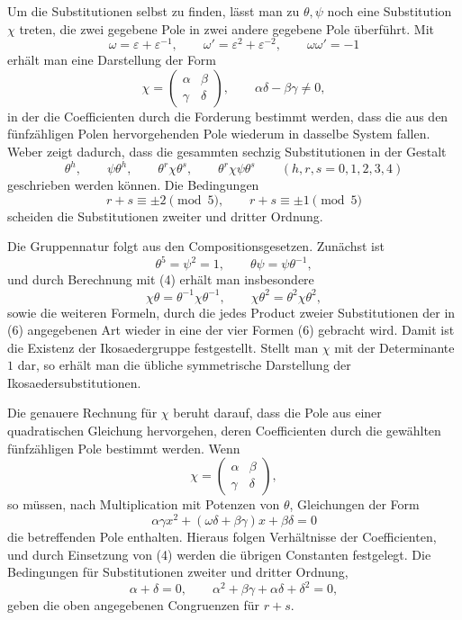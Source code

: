 \documentclass[11pt]{article}
\providecommand{\eps}{\varepsilon}
\providecommand{\eps}{\varepsilon}
\providecommand{\mat}[4]{\begin{pmatrix}#1&#2\\#3&#4\end{pmatrix}}
\providecommand{\mat}[4]{\begin{pmatrix}#1&#2\\#3&#4\end{pmatrix}}
\begin{document}
Um die Substitutionen selbst zu finden, lässt man zu $\theta,\psi$ noch eine Substitution $\chi$ treten, die zwei gegebene Pole in zwei andere gegebene Pole überführt. Mit
\[
 \omega=\eps+\eps^{-1},\qquad \omega'=\eps^2+\eps^{-2},\qquad
 \omega\omega'=-1
\tag{4}
\]
erhält man eine Darstellung der Form
\begin{equation}
 \chi=\mat{\alpha}{\beta}{\gamma}{\delta},
\qquad
 \alpha\delta-\beta\gamma\ne0,
\tag{5}
\end{equation}
in der die Coefficienten durch die Forderung bestimmt werden, dass die aus den fünfzähligen Polen hervorgehenden Pole wiederum in dasselbe System fallen. Weber zeigt dadurch, dass die gesammten sechzig Substitutionen in der Gestalt
\begin{equation}
 \theta^h,\qquad
 \psi\theta^h,\qquad
 \theta^r\chi\theta^s,\qquad
 \theta^r\chi\psi\theta^s\qquad (h,r,s=0,1,2,3,4)
\tag{6}
\end{equation}
geschrieben werden können. Die Bedingungen
\[
 r+s\equiv \pm2\pmod5,\qquad r+s\equiv \pm1\pmod5
\]
scheiden die Substitutionen zweiter und dritter Ordnung.

Die Gruppennatur folgt aus den Compositionsgesetzen. Zunächst ist
\begin{equation}
 \theta^5=\psi^2=1,\qquad \theta\psi=\psi\theta^{-1},
\tag{7}
\end{equation}
und durch Berechnung mit (4) erhält man insbesondere
\begin{equation}
 \chi\theta=\theta^{-1}\chi\theta^{-1},\qquad
 \chi\theta^2=\theta^2\chi\theta^2,
\tag{8}
\end{equation}
sowie die weiteren Formeln, durch die jedes Product zweier Substitutionen der in (6) angegebenen Art wieder in eine der vier Formen (6) gebracht wird. Damit ist die Existenz der Ikosaedergruppe festgestellt. Stellt man $\chi$ mit der Determinante $1$ dar, so erhält man die übliche symmetrische Darstellung der Ikosaedersubstitutionen.

Die genauere Rechnung für $\chi$ beruht darauf, dass die Pole aus einer quadratischen Gleichung hervorgehen, deren Coefficienten durch die gewählten fünfzähligen Pole bestimmt werden. Wenn
\[
 \chi=\mat{\alpha}{\beta}{\gamma}{\delta},
\]
so müssen, nach Multiplication mit Potenzen von $\theta$, Gleichungen der Form
\[
 \alpha\gamma x^2+(\omega\delta+\beta\gamma)x+\beta\delta=0
\]
die betreffenden Pole enthalten. Hieraus folgen Verhältnisse der Coefficienten, und durch Einsetzung von (4) werden die übrigen Constanten festgelegt. Die Bedingungen für Substitutionen zweiter und dritter Ordnung,
\[
 \alpha+\delta=0,\qquad
 \alpha^2+\beta\gamma+\alpha\delta+\delta^2=0,
\]
geben die oben angegebenen Congruenzen für $r+s$.
\end{document}
